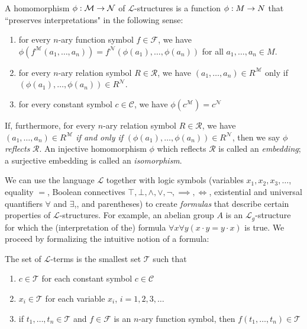 \begin{definition}
A homomorphism $\phi:\mathcal{M}\rightarrow \mathcal{N}$ of $\mathcal{L}$-structures is a function $\phi:M\rightarrow N$ that ``preserves interpretations" in the following sense:
\begin{enumerate}
	\item for every $n$-ary function symbol $f\in\mathcal{F}$, we have $\phi(f^{\mathcal{M}}(a_1,\dots, a_n))=f^{\mathcal{N}}(\phi(a_1),\dots, \phi(a_n))$ for all $a_1,\dots, a_n\in M$.
	\item for every $n$-ary relation symbol $R\in\mathcal{R}$, we have $(a_1,\dots, a_n)\in R^{\mathcal{M}}$ only if $(\phi(a_1),\dots, \phi(a_n))\in R^{\mathcal{N}}$.
	\item for every constant symbol $c\in\mathcal{C}$, we have $\phi(c^{\mathcal{M}})=c^{\mathcal{N}}$
\end{enumerate}
If, furthermore, for every $n$-ary relation symbol $R\in\mathcal{R}$, we have $(a_1,\dots, a_n)\in R^{\mathcal{M}}$ \emph{if and only if} $(\phi(a_1),\dots, \phi(a_n))\in R^{\mathcal{N}}$, then we say $\phi$ \emph{reflects} $\mathcal{R}$. An injective homomorphism $\phi$ which reflects $\mathcal{R}$ is called an \emph{embedding}; a surjective embedding is called an \emph{isomorphism}.
\end{definition}

We can use the language $\mathcal{L}$ together with logic symbols (variables $x_1,x_2,x_3,\dots$, equality $=$, Boolean connectives $\top, \bot, \wedge, \vee, \neg, \implies, \iff$, existential and universal quantifiers $\forall$ and $\exists$,, and parentheses) to create \emph{formulas} that describe certain properties of $\mathcal{L}$-structures. For example, an abelian group $A$ is an $\mathcal{L}_g$-structure for which the (interpretation of the) formula $\forall x \forall y( x\cdot y = y\cdot x)$ is true. We proceed by formalizing the intuitive notion of a formula:

\begin{definition}
The set of $\mathcal{L}$-terms is the smallest set $\mathcal{T}$ such that 
\begin{enumerate}
	\item $c\in \mathcal{T}$ for each constant symbol $c\in\mathcal{C}$
	\item $x_i\in \mathcal{T}$ for each variable $x_i$, $i=1,2,3,\dots$
	\item if $t_1,\dots, t_n\in\mathcal{T}$ and $f\in\mathcal{F}$ is an $n$-ary function symbol, then $f(t_1,\dots, t_n)\in\mathcal{T}$
\end{enumerate} 
\end{definition}

